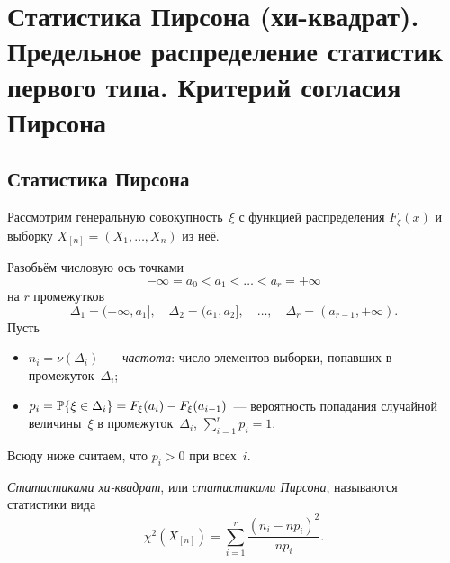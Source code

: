 \section[Статистика Пирсона. Критерий согласия Пирсона]%
  {Статистика Пирсона (хи-квадрат).
   Предельное распределение статистик первого типа.
   Критерий согласия Пирсона}
\label{lec:04}

\subsection{Статистика Пирсона}
\label{lec04:pearson-statistic}

Рассмотрим генеральную совокупность~$\xi$ с функцией распределения $F_\xi(x)$
и выборку $X_{[n]} = (X_1, \ldots, X_n)$ из неё.

Разобьём числовую ось точками
\[
  -\infty = a_0 < a_1 < \ldots < a_r = +\infty
\]
на $r$ промежутков
\[
  \Delta_1 = (-\infty, a_1], \quad \Delta_2 = (a_1, a_2], \quad \ldots, \quad
  \Delta_r = (a_{r-1}, +\infty).
\]
Пусть
\begin{itemize}
  \item $n_i = \nu(\Delta_i)$~--- \emph{частота}: число элементов выборки, попавших
        в промежуток~$\Delta_i$;
  \item $p_i = \P\{\xi \in \Delta_i\} = F_\xi(a_i) - F_\xi(a_{i-1})$~--- вероятность попадания
        случайной величины~$\xi$ в промежуток~$\Delta_i$, $\sum_{i=1}^{r} p_i = 1$.
\end{itemize}
Всюду ниже считаем, что $p_i > 0$ при всех~$i$.

\begin{definition}
  \emph{Статистиками хи-квадрат}, или \emph{статистиками Пирсона}, называются статистики вида
  \[
    \chi^2(X_{[n]}) = \sum_{i=1}^{r} \frac{(n_i - n p_i)^2}{n p_i}.
  \]
\end{definition}

